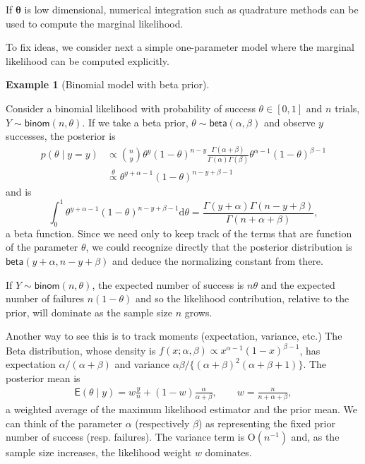 \documentclass[
  11pt,
  letterpaper,
]{scrbook}
\theoremstyle{definition}
\theoremstyle{plain}
\theoremstyle{plain}
\theoremstyle{definition}
\theoremstyle{definition}
\newtheorem{example}{Example}[chapter]
\theoremstyle{remark}
\begin{document}
If \(\boldsymbol{\theta}\) is low dimensional, numerical integration
such as quadrature methods can be used to compute the marginal
likelihood.

To fix ideas, we consider next a simple one-parameter model where the
marginal likelihood can be computed explicitly.

\begin{example}[Binomial model with beta
prior]\protect\hypertarget{exm-betabinomconjugate}{}\label{exm-betabinomconjugate}

Consider a binomial likelihood with probability of success
\(\theta \in [0,1]\) and \(n\) trials,
\(Y \sim \mathsf{binom}(n, \theta)\). If we take a beta prior,
\(\theta \sim \mathsf{beta}(\alpha, \beta)\) and observe \(y\)
successes, the posterior is \begin{align*}
p(\theta \mid y = y) &\propto \binom{n}{y} \theta^y (1-\theta)^{n-y} \frac{\Gamma(\alpha + \beta)}{\Gamma(\alpha) \Gamma(\beta)}\theta^{\alpha-1} (1-\theta)^{\beta-1}
\\&\stackrel{\theta}{\propto} \theta^{y+\alpha-1}(1-\theta)^{n-y+\beta-1}
\end{align*} and is
\[\int_{0}^{1} \theta^{y+\alpha-1}(1-\theta)^{n-y+\beta-1}\mathrm{d} \theta = \frac{\Gamma(y+\alpha)\Gamma(n-y+\beta)}{\Gamma(n+\alpha+\beta)},\]
a beta function. Since we need only to keep track of the terms that are
function of the parameter \(\theta\), we could recognize directly that
the posterior distribution is \(\mathsf{beta}(y+\alpha, n-y+\beta)\) and
deduce the normalizing constant from there.

If \(Y \sim \mathsf{binom}(n, \theta)\), the expected number of success
is \(n\theta\) and the expected number of failures \(n(1-\theta)\) and
so the likelihood contribution, relative to the prior, will dominate as
the sample size \(n\) grows.

Another way to see this is to track moments (expectation, variance,
etc.) The Beta distribution, whose density is
\(f(x; \alpha, \beta) \propto x^{\alpha-1} (1-x)^{\beta-1}\), has
expectation \(\alpha/(\alpha+\beta)\) and variance
\(\alpha\beta/\{(\alpha+\beta)^2(\alpha+\beta+1)\}\). The posterior mean
is \begin{align*}
 \mathsf{E}(\theta \mid y) = w\frac{y}{n} + (1-w) \frac{\alpha}{\alpha+\beta}, 
 \qquad w = \frac{n}{n+\alpha + \beta},
 \end{align*} a weighted average of the maximum likelihood estimator and
the prior mean. We can think of the parameter \(\alpha\) (respectively
\(\beta\)) as representing the fixed prior number of success (resp.
failures). The variance term is \(\mathrm{O}(n^{-1})\) and, as the
sample size increases, the likelihood weight \(w\) dominates.


\end{example}
\end{document}
